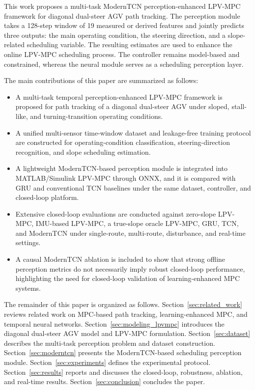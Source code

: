 \documentclass{ieeeaccess}
\begin{document}
This work proposes a multi-task ModernTCN perception-enhanced LPV-MPC framework for diagonal dual-steer AGV path tracking. The perception module takes a 128-step window of 19 measured or derived features and jointly predicts three outputs: the main operating condition, the steering direction, and a slope-related scheduling variable. The resulting estimates are used to enhance the online LPV-MPC scheduling process. The controller remains model-based and constrained, whereas the neural module serves as a scheduling perception layer.

The main contributions of this paper are summarized as follows:

\begin{itemize}

\item A multi-task temporal perception-enhanced LPV-MPC framework is proposed for path tracking of a diagonal dual-steer AGV under sloped, stall-like, and turning-transition operating conditions.

\item A unified multi-sensor time-window dataset and leakage-free training protocol are constructed for operating-condition classification, steering-direction recognition, and slope scheduling estimation.

\item A lightweight ModernTCN-based perception module is integrated into MATLAB/Simulink LPV-MPC through ONNX, and it is compared with GRU and conventional TCN baselines under the same dataset, controller, and closed-loop platform.

\item Extensive closed-loop evaluations are conducted against zero-slope LPV-MPC, IMU-based LPV-MPC, a true-slope oracle LPV-MPC, GRU, TCN, and ModernTCN under single-route, multi-route, disturbance, and real-time settings.

\item A causal ModernTCN ablation is included to show that strong offline perception metrics do not necessarily imply robust closed-loop performance, highlighting the need for closed-loop validation of learning-enhanced MPC systems.

\end{itemize}

The remainder of this paper is organized as follows. Section~\ref{sec:related_work} reviews related work on MPC-based path tracking, learning-enhanced MPC, and temporal neural networks. Section~\ref{sec:modeling_lpvmpc} introduces the diagonal dual-steer AGV model and LPV-MPC formulation. Section~\ref{sec:dataset} describes the multi-task perception problem and dataset construction. Section~\ref{sec:moderntcn} presents the ModernTCN-based scheduling perception module. Section~\ref{sec:experiments} defines the experimental protocol. Section~\ref{sec:results} reports and discusses the closed-loop, robustness, ablation, and real-time results. Section~\ref{sec:conclusion} concludes the paper.
\end{document}
